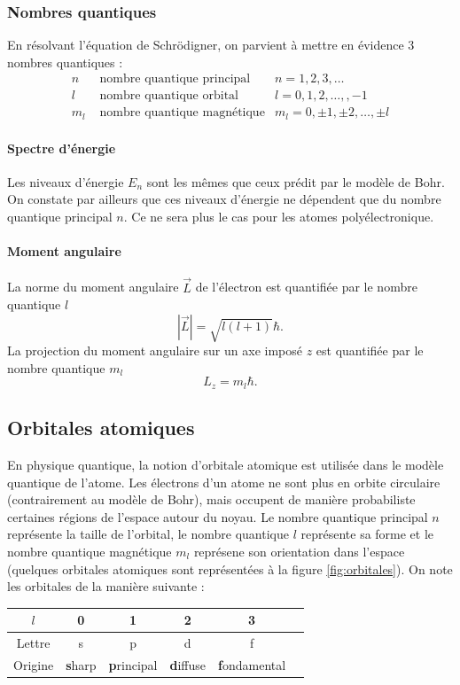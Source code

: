 \subsubsection{Nombres quantiques}
En résolvant l'équation de Schrödigner, on parvient à mettre en 
évidence 3 nombres quantiques :
\begin{align*}
	n 	&	\text{ nombre quantique principal} 	& n = 1,2,3,\dots \\
	l 	& \text{ nombre quantique orbital} 		& l = 0,1,2,\dots,,-1 \\
	m_l &	\text{ nombre quantique magnétique}	& m_l = 0,\pm 1,\pm 2,\dots,\pm l
\end{align*}

\paragraph{Spectre d'énergie}
Les niveaux d'énergie $E_n$ sont les mêmes que ceux
prédit par le modèle de Bohr. On constate par ailleurs
que ces niveaux d'énergie ne dépendent que du nombre
quantique principal $n$. Ce ne sera plus le cas
pour les atomes polyélectronique.
\paragraph{Moment angulaire}
La norme du moment angulaire $\vec{L}$ de l'électron est quantifiée
par le nombre quantique $l$
\[ |\vec{L}| = \sqrt{l(l+1)}\hbar. \]
La projection du moment angulaire sur un axe imposé $z$
est quantifiée par le nombre quantique $m_l$
\[ L_z = m_l\hbar. \]

\subsection{Orbitales atomiques}
En physique quantique, la notion d'orbitale atomique
est utilisée dans le modèle quantique de l'atome. 
Les électrons d'un atome ne sont plus en orbite circulaire
(contrairement au modèle de Bohr), mais occupent
de manière probabiliste certaines régions de l'espace
autour du noyau. Le nombre quantique principal
$n$ représente la taille de l'orbital, le nombre
quantique $l$ représente sa forme et le nombre
quantique magnétique $m_l$ représene son orientation
dans l'espace (quelques orbitales
atomiques sont représentées à la figure 
\ref{fig:orbitales}). On note les orbitales de
la manière suivante :

\begin{center}
  \begin{tabular}{c|ccccc}
    $l$ 		& 0 & 1 & 2 & 3 \\
    \hline
    Lettre 	& s & p & d & f \\
    Origine & {\bf s}harp & {\bf p}rincipal & {\bf d}iffuse & {\bf f}ondamental
  \end{tabular}
\end{center}

